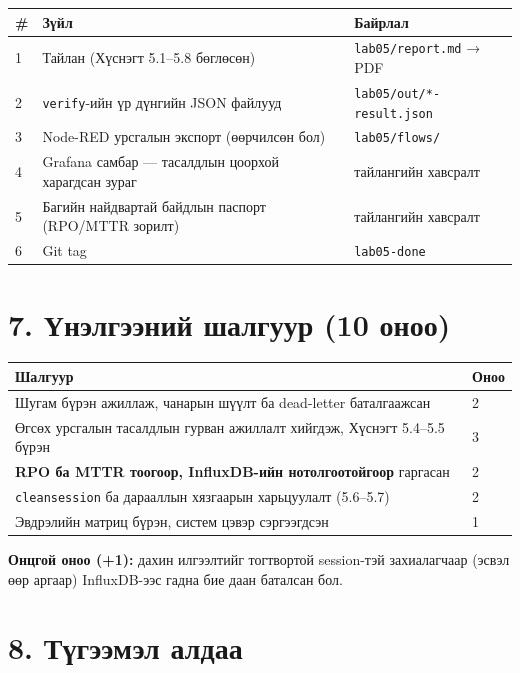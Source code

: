 \begingroup\scriptsize\begin{longtable}[]{@{}lll@{}}
\toprule
\# & Зүйл & Байрлал\tabularnewline
\midrule
\endhead
1 & Тайлан (Хүснэгт 5.1--5.8 бөглөсөн) & \texttt{lab05/report.md} → PDF\tabularnewline
2 & \texttt{verify}-ийн үр дүнгийн JSON файлууд & \texttt{lab05/\allowbreak{}out/\allowbreak{}*-result.\allowbreak{}json}\tabularnewline
3 & Node-RED урсгалын экспорт (өөрчилсөн бол) & \texttt{lab05/flows/}\tabularnewline
4 & Grafana самбар --- тасалдлын цоорхой харагдсан зураг & тайлангийн хавсралт\tabularnewline
5 & Багийн найдвартай байдлын паспорт (RPO/MTTR зорилт) & тайлангийн хавсралт\tabularnewline
6 & Git tag & \texttt{lab05-done}\tabularnewline
\bottomrule
\end{longtable}\endgroup

\hypertarget{ux4afux43dux44dux43bux433ux44dux44dux43dux438ux439-ux448ux430ux43bux433ux443ux443ux440-10-ux43eux43dux43eux43e}{%
\section{7. Үнэлгээний шалгуур (10 оноо)}\label{ux4afux43dux44dux43bux433ux44dux44dux43dux438ux439-ux448ux430ux43bux433ux443ux443ux440-10-ux43eux43dux43eux43e}}

\begingroup\scriptsize\begin{longtable}[]{@{}ll@{}}
\toprule
Шалгуур & Оноо\tabularnewline
\midrule
\endhead
Шугам бүрэн ажиллаж, чанарын шүүлт ба dead-letter баталгаажсан & 2\tabularnewline
Өгсөх урсгалын тасалдлын гурван ажиллалт хийгдэж, Хүснэгт 5.4--5.5 бүрэн & 3\tabularnewline
\textbf{RPO ба MTTR тоогоор, InfluxDB-ийн нотолгоотойгоор} гаргасан & 2\tabularnewline
\texttt{cleansession} ба дарааллын хязгаарын харьцуулалт (5.6--5.7) & 2\tabularnewline
Эвдрэлийн матриц бүрэн, систем цэвэр сэргээгдсэн & 1\tabularnewline
\bottomrule
\end{longtable}\endgroup

\textbf{Онцгой оноо (+1):} дахин илгээлтийг тогтвортой session-тэй захиалагчаар (эсвэл өөр аргаар) InfluxDB-ээс гадна бие даан баталсан бол.

\hypertarget{ux442ux4afux433ux44dux44dux43cux44dux43b-ux430ux43bux434ux430ux430}{%
\section{8. Түгээмэл алдаа}\label{ux442ux4afux433ux44dux44dux43cux44dux43b-ux430ux43bux434ux430ux430}}

